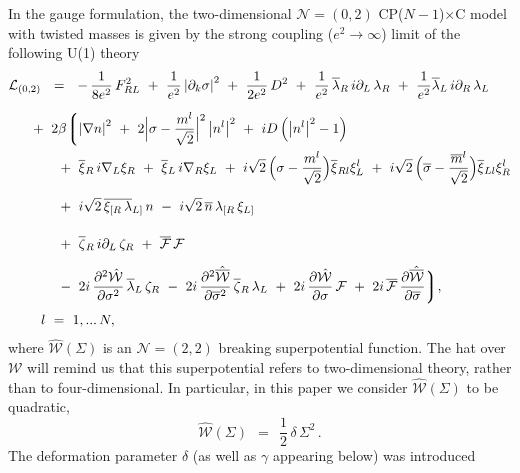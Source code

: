 \documentclass[12pt]{article}
\newcommand{\ntwot}{${\mathcal N}= \left(2,2\right) $ }
\newcommand{\ntwoo}{${\mathcal N}= \left(0,2\right) $ }
\newcommand{\p}{\partial}
\newcommand{\ov}{\overline}
\newcommand{\mc}[1]{\mathcal{#1}}
\newcommand{\bxir}{\ov{\xi}{}_R}
\newcommand{\bxil}{\ov{\xi}{}_L}
\newcommand{\xir}{\xi_R}
\newcommand{\xil}{\xi_L}
\newcommand{\bzr}{\ov{\zeta}{}_R}
\newcommand{\zr}{\zeta_R}
\newcommand{\nbar}{\ov{n}}
\newcommand{\CPC}{CP($N-1$)$\times$C }
\newcommand{\lar}{\lambda_R}
\newcommand{\lal}{\lambda_L}
\newcommand{\blar}{\ov{\lambda}{}_R}
\newcommand{\blal}{\ov{\lambda}{}_L}
\newcommand{\ff}{\mc{F}}
\newcommand{\bff}{\ov{\mc{F}}}
\begin{document}
In the gauge formulation, the two-dimensional
\ntwoo \CPC  model with twisted
masses  is given by the strong coupling ($ e^2\to\infty $) limit  of
the following U(1) theory
\begin{align}
\label{sigma_full}
% 
\notag
 	\mc{L}_\text{(0,2)} & ~~=~~
	-\,\frac{1}{8e^2}\,F_{RL}^2  ~+~ \frac{1}{e^2} \left|\p_k \sigma\right|^2 
	~+~ \frac{1}{2e^2}\, D^2
	~+~ \frac{1}{e^2}\, \blar\, i\p_L\, \lar  ~+~  \frac{1}{e^2} \blal\, i\p_R\, \lal
	\\[2mm]
%
\notag
	&
	\hspace{-0.4cm}
	~+~ 2\beta \biggl \lgroup
	\left| \nabla n \right|^2  ~+~ 2 \Bigl| \sigma - 
	\frac{m^l}{\sqrt{2}} \Bigr|^2 \left| n^l \right|^2
	~+~ iD \left( \left|n^l \right|^2 - 1 \right)
	\\
%
\notag
	&
	\hspace{-0.4cm}\phantom{2\beta\lgroup}
	~+~ \bxir\, i\nabla_L \xir  ~+~ \bxil\, i\nabla_R \xil ~+~
	i\sqrt{2}\, \Bigl( \sigma - \frac{m^l}{\sqrt{2}} \Bigr) \ov{\xi}{}_{Rl} \xi_L^l
	~+~ i\sqrt{2}\, \Bigl( \ov{\sigma} - \frac{\ov{m}{}^l}{\sqrt{2}} \Bigr) \ov{\xi}{}_{Ll} \xi_R^l
	\\[2mm]
%
	&
	\hspace{-0.4cm}\phantom{2\beta\lgroup}
	~+~ i\sqrt{2}\, \ov{\xi_{[R}\, \lambda}{}_{L]}\, n
	~-~ i\sqrt{2}\, \nbar\,  \lambda_{[R}\, \xi_{L]}
	\\[2mm]
%
\notag
	&
	\hspace{-0.4cm}\phantom{2\beta\lgroup}
	~+~ \bzr\, i\p_L\, \zr   ~+~   \bff\, \ff
	\\
%
\notag
	&
	\hspace{-0.4cm}\phantom{2\beta\lgroup}
	~-~ 2i\, \frac{\p^2 \hat{\mc{W}}}{\p \sigma^2}\, \blal\, \zr
	~-~ 2i\, \frac{\p^2 \hat{\ov{\mc{W}}}}{\p \ov{\sigma}{}^2}\, \bzr\, \lal
	~+~ 2i\, \frac{\p \hat{\mc{W}}}{\p \sigma}\, \ff
	~+~ 2i\, \bff\, \frac{\p \hat{\ov{\mc{W}}}}{\p \ov{\sigma}}
	\biggr\rgroup ,
	\\[1mm]
%
\notag
	&
	l~=~1,...\,N,
\end{align}
	where $ \hat{\mc{W}}(\Sigma) $ is an   \ntwot breaking superpotential 
	function. The hat over ${\mc{W}}$ will remind us that
	this superpotential refers to two-dimensional theory, rather than to four-dimensional.
	In particular, in this paper we consider
$ \hat{\mc{W}}(\Sigma) $ to be   quadratic,
\[
	\hat{\mc{W}}(\Sigma) ~~=~~ \frac{1}{2}\, \delta\, \Sigma^2\,.
\]
The deformation parameter $\delta$ (as well as $\gamma$ appearing below)
was introduced 
\end{document}
